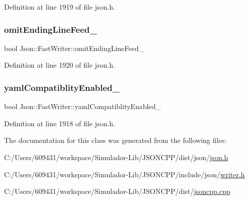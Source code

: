 Definition at line 1919 of file json.\+h.

\hypertarget{class_json_1_1_fast_writer_abd6e13851db6dcf59d84af68d48d50ac}{}\label{class_json_1_1_fast_writer_abd6e13851db6dcf59d84af68d48d50ac} 
\subsubsection{\texorpdfstring{omit\+Ending\+Line\+Feed\+\_\+}{omitEndingLineFeed\_}}
{\footnotesize\ttfamily bool Json\+::\+Fast\+Writer\+::omit\+Ending\+Line\+Feed\+\_\+\hspace{0.3cm}{\ttfamily [private]}}



Definition at line 1920 of file json.\+h.

\hypertarget{class_json_1_1_fast_writer_a4c4c1911179bf472d24492915b0e489a}{}\label{class_json_1_1_fast_writer_a4c4c1911179bf472d24492915b0e489a} 
\subsubsection{\texorpdfstring{yaml\+Compatiblity\+Enabled\+\_\+}{yamlCompatiblityEnabled\_}}
{\footnotesize\ttfamily bool Json\+::\+Fast\+Writer\+::yaml\+Compatiblity\+Enabled\+\_\+\hspace{0.3cm}{\ttfamily [private]}}



Definition at line 1918 of file json.\+h.



The documentation for this class was generated from the following files\+:\begin{DoxyCompactItemize}
\item 
C\+:/\+Users/609431/workspace/\+Simulador-\/\+Lib/\+J\+S\+O\+N\+C\+P\+P/dist/json/\hyperlink{dist_2json_2json_8h}{json.\+h}\item 
C\+:/\+Users/609431/workspace/\+Simulador-\/\+Lib/\+J\+S\+O\+N\+C\+P\+P/include/json/\hyperlink{writer_8h}{writer.\+h}\item 
C\+:/\+Users/609431/workspace/\+Simulador-\/\+Lib/\+J\+S\+O\+N\+C\+P\+P/dist/\hyperlink{jsoncpp_8cpp}{jsoncpp.\+cpp}\end{DoxyCompactItemize}
